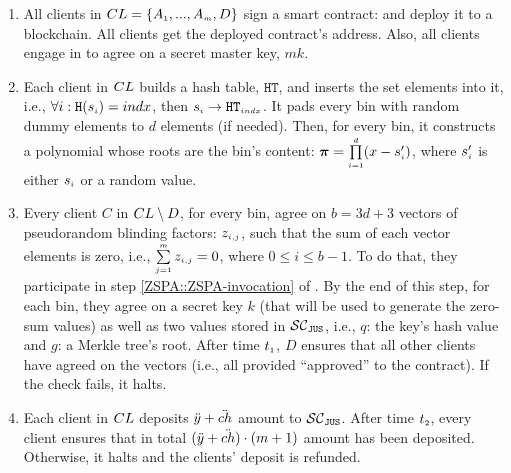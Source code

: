 \begin{enumerate}


\item\label{gen-FPSI-cont} All clients in ${CL}=\{ A_{\scriptscriptstyle 1},...,   A_{\scriptscriptstyle m},  D\}$ sign a smart contract: \scf and deploy it to a blockchain. All clients get the deployed contract's address. Also, all clients engage in \ct to agree on a secret master key, $mk$.

\item \label{encode-encrypt} Each client in ${CL}$  builds a  hash table,  $\mathtt{HT}$, and inserts the set elements into  it, i.e.,  $\forall i: \mathtt{H}( s_{\scriptscriptstyle i})={indx}$, then $ s_{\scriptscriptstyle i}\rightarrow \mathtt{HT}_{\scriptscriptstyle indx}$. It pads every bin with random dummy elements to $d$ elements (if needed). Then,  for every bin, it constructs a polynomial whose roots are the bin's content: $\bm\pi=\prod\limits^{\scriptscriptstyle d}_{\scriptscriptstyle i=1} (x-s'_{\scriptscriptstyle i})$, where $s'_{\scriptscriptstyle i}$ is either $s_{\scriptscriptstyle i}$ or a random value. 
%
\item \label{ZSPA} Every client $ C$ in ${CL}\setminus D$, for every bin, agree on $b=3d+3$ vectors of pseudorandom blinding factors: $z_{\scriptscriptstyle i,j}$, such that the sum of each vector elements is zero, i.e., $\sum\limits^{\scriptscriptstyle m}_{\scriptscriptstyle j=1}z_{\scriptscriptstyle i,j}=0$, where $0\leq i\leq b-1$. To do that, they participate in step \ref{ZSPA::ZSPA-invocation} of \zspaa. By the end of this step, for each bin, they agree on a secret key $k$ (that will be used to generate the zero-sum values) as well as two values stored in $\mathcal{SC}_{\mathtt{JUS}}$, i.e., $q$: the key's hash value and $g$: a Merkle tree's root. After time $t_{\scriptscriptstyle 1}$,  $D$ ensures that all other clients have agreed on the vectors (i.e., all provided ``approved''  to the contract). If the check fails, it halts. 
%
\item\label{F-PSI::each-client-deposit} Each client in ${CL}$ deposits $\ddot{y}+\ddot{ch}$ amount to $\mathcal{SC}_{\mathtt{JUS}}$. After time $t_{\scriptscriptstyle 2}$, every client ensures that in total $(\ddot{y}+\ddot{ch})\cdot (m+1)$ amount has been deposited. Otherwise, it halts and the clients' deposit is refunded. 








\end{enumerate}
